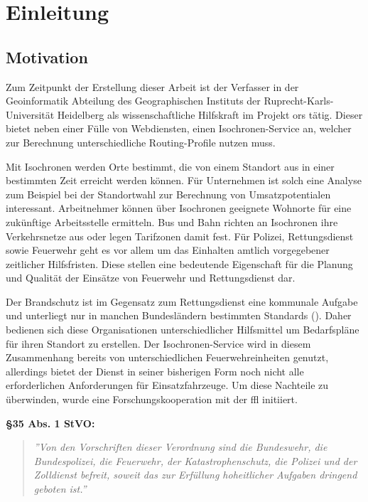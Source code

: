\section{Einleitung}

\subsection{Motivation}
Zum Zeitpunkt der Erstellung dieser Arbeit ist der Verfasser in der Geoinformatik Abteilung des Geographischen Instituts der Ruprecht-Karls-Universität Heidelberg als wissenschaftliche Hilfskraft im Projekt \gls{ors} tätig.
Dieser bietet neben einer Fülle von Webdiensten, einen Isochronen-Service an, welcher zur Berechnung unterschiedliche Routing-Profile nutzen muss.\par
Mit Isochronen werden Orte bestimmt, die von einem Standort aus in einer bestimmten Zeit erreicht werden können.
Für Unternehmen ist solch eine Analyse zum Beispiel bei der Standortwahl zur Berechnung von Umsatzpotentialen interessant.
Arbeitnehmer können über Isochronen geeignete Wohnorte für eine zukünftige Arbeitsstelle ermitteln.
Bus und Bahn richten an Isochronen ihre Verkehrsnetze aus oder legen Tarifzonen damit fest.
Für Polizei, Rettungsdienst sowie Feuerwehr geht es vor allem um das Einhalten amtlich vorgegebener zeitlicher Hilfsfristen.
Diese stellen eine bedeutende Eigenschaft für die Planung und Qualität der Einsätze von Feuerwehr und Rettungsdienst dar.\par
Der Brandschutz ist im Gegensatz zum Rettungsdienst eine kommunale Aufgabe und unterliegt nur in manchen Bundesländern bestimmten Standards (\cite{bedarfsplan}).
Daher bedienen sich diese Organisationen unterschiedlicher Hilfsmittel um Bedarfspläne für ihren Standort zu erstellen.
Der Isochronen-Service wird in diesem Zusammenhang bereits von unterschiedlichen Feuerwehreinheiten genutzt, allerdings bietet der Dienst in seiner bisherigen Form noch nicht alle erforderlichen Anforderungen für Einsatzfahrzeuge.
Um diese Nachteile zu überwinden, wurde eine Forschungskooperation mit der \gls{ffl} initiiert.
\vspace{1.2cm}

\textbf{§35 Abs. 1 StVO:}
\begin{quotation}
\label{cit:STVO}
{\itshape\rmfamily ''Von den Vorschriften dieser Verordnung sind die Bundeswehr, die Bundespolizei, die Feuerwehr, der Katastrophenschutz, die Polizei und der Zolldienst befreit, soweit das zur Erfüllung hoheitlicher Aufgaben dringend geboten ist.''}
\end{quotation}

